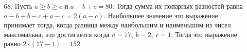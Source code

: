 68. Пусть $a\geqslant b\geqslant c$ и $a+b+c=80.$ Тогда сумма их попарных разностей равна $a-b+b-c+a-c=2(a-c).$ Наибольшее значение это выражение принимает тогда, когда разница между наибольшим и наименьшим из чисел максимальна, это достигается когда $a=77,\ b=2,\ c=1.$ Тогда это выражение равно $2\cdot(77-1)=152.$\\
